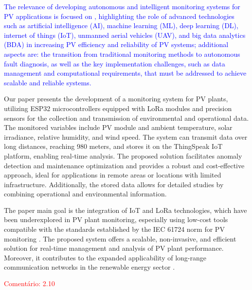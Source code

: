\documentclass{ieeeaccess}
\begin{document}
\textcolor{blue}{
The relevance of developing autonomous and intelligent monitoring systems for PV applications is focused on \cite{aghaei2024}, highlighting the role of advanced technologies such as artificial intelligence (AI), machine learning (ML), deep learning (DL), internet of things (IoT), unmanned aerial vehicles (UAV), and big data analytics (BDA) in increasing PV efficiency and reliability of PV systems; additional aspects are: the transition from traditional monitoring methods to autonomous fault diagnosis, as well as the key implementation challenges, such as data management and computational requirements, that must be addressed to achieve scalable and reliable systems.
}

Our paper presents the development of a monitoring system for PV plants, utilizing ESP32 microcontrollers equipped with LoRa modules and precision sensors for the collection and transmission of environmental and operational data. The monitored variables include PV module and ambient temperature, solar irradiance, relative humidity, and wind speed. The system can transmit data over long distances, reaching 980 meters,  and stores it on the ThingSpeak IoT platform, enabling real-time analysis. The proposed solution facilitates anomaly detection and maintenance optimization and provides a robust and cost-effective approach, ideal for applications in remote areas or locations with limited infrastructure. Additionally, the stored data allows for detailed studies by combining operational and environmental information.

The paper main goal is the integration of IoT and LoRa technologies, which have been underexplored in PV plant monitoring, especially using low-cost tools compatible with the standards established by the IEC 61724 norm for PV monitoring \cite{IEC61724}. The proposed system offers a scalable, non-invasive, and efficient solution for real-time management and analysis of PV plant performance. Moreover, it contributes to the expanded applicability of long-range communication networks in the renewable energy sector \cite{de2017monitoring,ansari2021review}.

\textcolor{red}{Comentário: 2.10}
\end{document}
